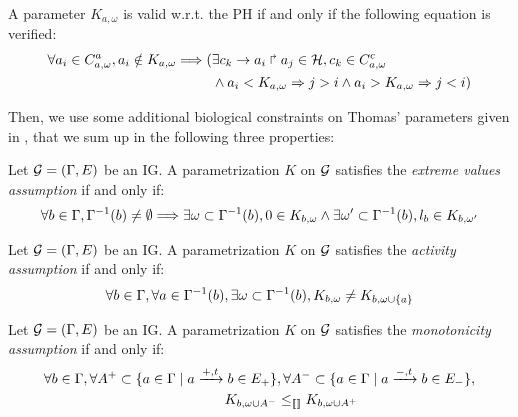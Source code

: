 \begin{property}\label{pro:K-valid}
A parameter $K_{a,\omega}$ is valid w.r.t. the PH if and only if the following equation is verified:
\begin{align*}
  \forall a_i\in C^a_{a,\omega}, a_i \notin K_{a,\omega} \Longrightarrow
    (& \exists c_k\rightarrow a_i\Rsh a_j\in\mathcal{H}, c_k \in C^c_{a,\omega} \\
     & \wedge a_i < K_{a,\omega} \Rightarrow j > i \wedge  a_i > K_{a,\omega} \Rightarrow j <i )
\end{align*}
\end{property}

Then, we use some additional biological constraints on Thomas' parameters given in
\cite{BernotSemBRN}, that we sum up in the following three properties:

\begin{property}
Let $\mathcal{G} = (\Gamma, E)$ be an IG. A parametrization $K$ on $\mathcal{G}$ satisfies the \emph{extreme values assumption} if and only if:
\label{pro:param_enum_extreme}
\begin{align*}
  \forall b \in \Gamma, \Gamma^{-1}(b) \neq \emptyset \Longrightarrow \exists \omega \subset \Gamma^{-1}(b), 0 \in K_{b,\omega} \wedge \exists \omega' \subset \Gamma^{-1}(b), l_b \in K_{b,\omega'}
\end{align*}
\end{property}

\begin{property}
\label{pro:param_enum_activity}
Let $\mathcal{G} = (\Gamma, E)$ be an IG. A parametrization $K$ on $\mathcal{G}$ satisfies the \emph{activity assumption} if and only if:
\begin{align*}
  \forall b \in \Gamma, \forall a \in \Gamma^{-1}(b), \exists \omega \subset \Gamma^{-1}(b), K_{b,\omega} \neq K_{b,\omega \cup \{ a \}}
\end{align*}
\end{property}

\begin{property}
\label{pro:param_enum_monotonicity}
Let $\mathcal{G} = (\Gamma, E)$ be an IG. A parametrization $K$ on $\mathcal{G}$ satisfies the \emph{monotonicity assumption} if and only if:
\begin{align*}
  \forall b \in \Gamma,
  \forall A^+ \subset \{ a \in \Gamma \mid a \xrightarrow{+, t} b \in E_+ \}&,
  \forall A^- \subset \{ a \in \Gamma \mid a \xrightarrow{-, t} b \in E_- \},\\
  K_{b,\omega \cup A^-} & \leq_{\llbracket\rrbracket} K_{b,\omega \cup A^+}
\end{align*}
\end{property}



